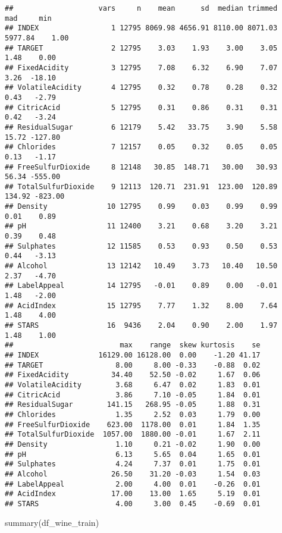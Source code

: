 \documentclass[
]{article}
\newenvironment{Shaded}{\begin{snugshade}}{\end{snugshade}}
\newcommand{\FunctionTok}[1]{\textcolor[rgb]{0.00,0.00,0.00}{#1}}
\newcommand{\NormalTok}[1]{#1}
\begin{document}
\begin{verbatim}
##                    vars     n    mean      sd  median trimmed     mad     min
## INDEX                 1 12795 8069.98 4656.91 8110.00 8071.03 5977.84    1.00
## TARGET                2 12795    3.03    1.93    3.00    3.05    1.48    0.00
## FixedAcidity          3 12795    7.08    6.32    6.90    7.07    3.26  -18.10
## VolatileAcidity       4 12795    0.32    0.78    0.28    0.32    0.43   -2.79
## CitricAcid            5 12795    0.31    0.86    0.31    0.31    0.42   -3.24
## ResidualSugar         6 12179    5.42   33.75    3.90    5.58   15.72 -127.80
## Chlorides             7 12157    0.05    0.32    0.05    0.05    0.13   -1.17
## FreeSulfurDioxide     8 12148   30.85  148.71   30.00   30.93   56.34 -555.00
## TotalSulfurDioxide    9 12113  120.71  231.91  123.00  120.89  134.92 -823.00
## Density              10 12795    0.99    0.03    0.99    0.99    0.01    0.89
## pH                   11 12400    3.21    0.68    3.20    3.21    0.39    0.48
## Sulphates            12 11585    0.53    0.93    0.50    0.53    0.44   -3.13
## Alcohol              13 12142   10.49    3.73   10.40   10.50    2.37   -4.70
## LabelAppeal          14 12795   -0.01    0.89    0.00   -0.01    1.48   -2.00
## AcidIndex            15 12795    7.77    1.32    8.00    7.64    1.48    4.00
## STARS                16  9436    2.04    0.90    2.00    1.97    1.48    1.00
##                         max    range  skew kurtosis    se
## INDEX              16129.00 16128.00  0.00    -1.20 41.17
## TARGET                 8.00     8.00 -0.33    -0.88  0.02
## FixedAcidity          34.40    52.50 -0.02     1.67  0.06
## VolatileAcidity        3.68     6.47  0.02     1.83  0.01
## CitricAcid             3.86     7.10 -0.05     1.84  0.01
## ResidualSugar        141.15   268.95 -0.05     1.88  0.31
## Chlorides              1.35     2.52  0.03     1.79  0.00
## FreeSulfurDioxide    623.00  1178.00  0.01     1.84  1.35
## TotalSulfurDioxide  1057.00  1880.00 -0.01     1.67  2.11
## Density                1.10     0.21 -0.02     1.90  0.00
## pH                     6.13     5.65  0.04     1.65  0.01
## Sulphates              4.24     7.37  0.01     1.75  0.01
## Alcohol               26.50    31.20 -0.03     1.54  0.03
## LabelAppeal            2.00     4.00  0.01    -0.26  0.01
## AcidIndex             17.00    13.00  1.65     5.19  0.01
## STARS                  4.00     3.00  0.45    -0.69  0.01
\end{verbatim}

\begin{Shaded}
\begin{Highlighting}[]
\FunctionTok{summary}\NormalTok{(df\_wine\_train)}
\end{Highlighting}
\end{Shaded}
\end{document}
